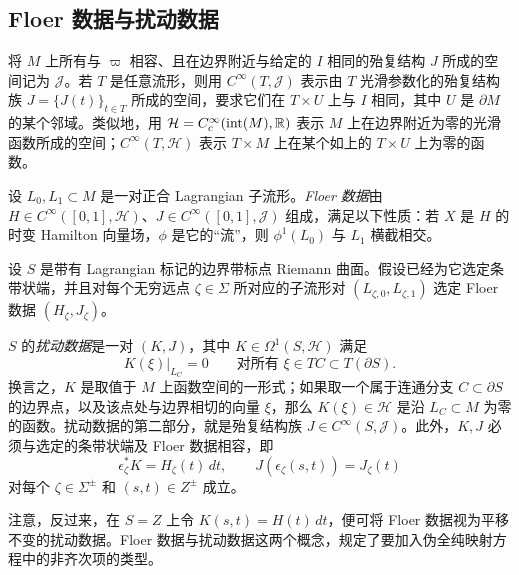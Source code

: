 \subsection{Floer 数据与扰动数据}\label{sec:8e}
将 $M$ 上所有与 $\varpi$ 相容、且在边界附近与给定的 $I$ 相同的殆复结构 $J$ 所成的空间记为 $\mathcal J$。若 $T$ 是任意流形，则用 $C^\infty(T,\mathcal J)$ 表示由 $T$ 光滑参数化的殆复结构族
$J=\{J(t)\}_{t\in T}$ 所成的空间，要求它们在 $T\times U$ 上与 $I$ 相同，其中 $U$ 是 $\partial M$ 的某个邻域。类似地，用 $\mathcal H=C_c^\infty(\operatorname{int}(M),\mathbb R)$ 表示 $M$ 上在边界附近为零的光滑函数所成的空间；$C^\infty(T,\mathcal H)$ 表示 $T\times M$ 上在某个如上的 $T\times U$ 上为零的函数。
\begin{definition*}
设 $L_0,L_1\subset M$ 是一对正合 Lagrangian 子流形。\emph{Floer 数据}由 $H\in C^\infty([0,1],\mathcal H)$、$J\in C^\infty([0,1],\mathcal J)$ 组成，满足以下性质：若 $X$ 是 $H$ 的时变 Hamilton 向量场，$\phi$ 是它的“流”，则 $\phi^1(L_0)$ 与 $L_1$ 横截相交。
\end{definition*}
设 $S$ 是带有 Lagrangian 标记的边界带标点 Riemann 曲面。假设已经为它选定条带状端，并且对每个无穷远点 $\zeta\in\Sigma$ 所对应的子流形对 $(L_{\zeta,0},L_{\zeta,1})$ 选定 Floer 数据 $(H_\zeta,J_\zeta)$。
\begin{definition*}
$S$ 的\emph{扰动数据}是一对 $(K,J)$，其中 $K\in\Omega^1(S,\mathcal H)$ 满足
\begin{equation}\label{eq:8.6}
K(\xi)|_{L_C}=0\qquad\text{对所有 }\xi\in TC\subset T(\partial S).
\end{equation}
换言之，$K$ 是取值于 $M$ 上函数空间的一形式；如果取一个属于连通分支 $C\subset\partial S$ 的边界点，以及该点处与边界相切的向量 $\xi$，那么 $K(\xi)\in\mathcal H$ 是沿 $L_C\subset M$ 为零的函数。扰动数据的第二部分，就是殆复结构族 $J\in C^\infty(S,\mathcal J)$。此外，$K,J$ 必须与选定的条带状端及 Floer 数据相容，即
\begin{equation}\label{eq:8.7}
\epsilon_\zeta^*K=H_\zeta(t)\,dt,\qquad J(\epsilon_\zeta(s,t))=J_\zeta(t)
\end{equation}
对每个 $\zeta\in\Sigma^\pm$ 和 $(s,t)\in Z^\pm$ 成立。
\end{definition*}
注意，反过来，在 $S=Z$ 上令 $K(s,t)=H(t)\,dt$，便可将 Floer 数据视为平移不变的扰动数据。Floer 数据与扰动数据这两个概念，规定了要加入伪全纯映射方程中的非齐次项的类型。

